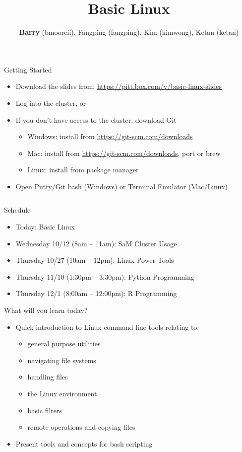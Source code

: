 \documentclass[hyperref={pdfpagelabels=false},12pt]{beamer}
\title[Basic Unix/Linux]{{Basic Linux}}
\author[Basic Unix/Linux]{{\textbf{Barry} (bmooreii), Fangping (fangping), Kim (kimwong), Ketan (ketan)}}
\institute[SaM]{Center for Simulation and Modeling}
\date{}
\newcommand{\myvbutton}[2]{\vfill\hyperlink{#1}{\beamerbutton{{#2}}}}
\begin{document}
\begin{frame}[label=started]{Getting Started}
    \begin{itemize}
        \item Download the slides from: \url{https://pitt.box.com/v/basic-linux-slides}
        \item Log into the cluster, or
        \item If you don't have access to the cluster, download Git
        \begin{itemize}
            \item Windows: install from \url{https://git-scm.com/downloads}
            \item Mac: install from \url{https://git-scm.com/downloads}, port or brew
            \item Linux: install from package manager
        \end{itemize}
        \item Open Putty/Git bash (Windows) or Terminal Emulator (Mac/Linux)
    \end{itemize}
\inputminted[bgcolor=lightgray,linenos,fontsize=\scriptsize]{bash}{code/getting-started.txt}
\myvbutton{navigate}{a clickable button}
\end{frame}

\begin{frame}[plain]
\titlepage
\end{frame}

\begin{frame}{Schedule}
\begin{itemize}
    \item Today: Basic Linux
    \item Wednesday 10/12 (8am -- 11am): SaM Cluster Usage
    \item Thursday 10/27 (10am -- 12pm): Linux Power Tools
    \item Thursday 11/10 (1:30pm -- 3:30pm): Python Programming
    \item Thursday 12/1 (8:00am -- 12:00pm): R Programming
\end{itemize}
\end{frame}

\begin{frame}{What will you learn today?}
    \begin{itemize}
        \item Quick introduction to Linux command line tools relating to:
        \begin{itemize}
            \item general purpose utilities
            \item navigating file systems
            \item handling files
            \item the Linux environment
            \item basic filters
            \item remote operations and copying files
        \end{itemize}
        \item Present tools and concepts for bash scripting
    \end{itemize}
\end{frame}
\end{document}
